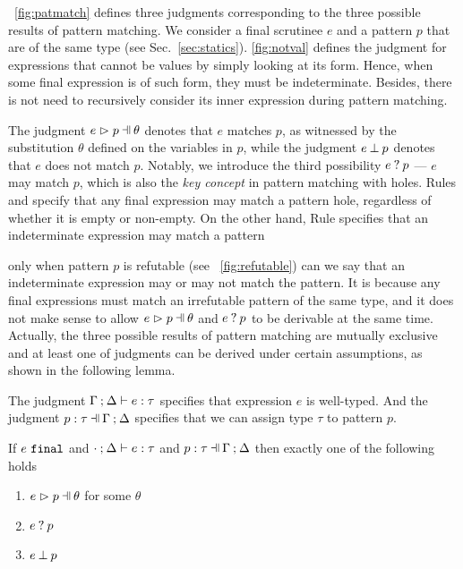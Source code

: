 \documentclass[runningheads,envcountsame,a4paper]{llncs}
\begin{document}




\figurename~\ref{fig:patmatch} defines three judgments corresponding to the
three possible results of pattern matching. We consider a final scrutinee $e$
and a pattern $p$ that are of the same type (see Sec.~\ref{sec:statics}). \autoref{fig:notval} defines the judgment for expressions that cannot be values by simply looking at its form. Hence, when some final expression is of such form, they must be indeterminate. Besides, there is not need to recursively consider its inner expression during pattern matching.

The judgment $\hpatmatch{e}{p}{\theta}$ denotes that $e$ matches $p$, as witnessed by
the substitution $\theta$ defined on the variables in $p$, while the judgment
$e \mathbin{\bot} p$ denotes that $e$ does not match $p$. Notably, we introduce the
third possibility $e \mathbin{?} p$ --- $e$ may match $p$, which is also the
\textit{key concept}
in pattern matching with holes. Rules \MMEHole and \MMHole
specify that any final expression may match a pattern hole, regardless of
whether it is empty or non-empty. On the other hand, Rule \MMNotVal specifies that
an indeterminate expression may match a pattern %

only when pattern $p$ is
refutable (see \figurename~\ref{fig:refutable}) can we say that an indeterminate
expression may or may not match the pattern. It is because any final expressions
must match an irrefutable pattern of the same type, and it does not make sense to allow
$\hpatmatch{e}{p}{\theta}$ and $e \mathbin{?} p$ to be derivable at the same time. Actually,
the three possible results of pattern matching are mutually exclusive and at
least one of judgments can be derived under certain assumptions, as shown in the
following lemma.

The judgment $\Gamma \mathbin{;} \Delta \vdash e : \tau$ specifies that expression $e$ is well-typed. And the judgment $\hpattyp{p}{\tau}{\Gamma}{\Delta}$ specifies that we can assign type $\tau$ to pattern $p$.
\begin{lemma}
  \label{lem:match-determinism}
  If $e ~\mathtt{final}$ and $\cdot \mathbin{;} \Delta \vdash e : \tau$ and $\hpattyp{p}{\tau}{\Gamma}{\Delta}$ then exactly one of the following holds
  \begin{enumerate}
    \item $\hpatmatch{e}{p}{\theta}$ for some $\theta$
    \item $e \mathbin{?} p$
    \item $e \mathbin{\bot} p$
  \end{enumerate}
\end{lemma}
\end{document}
